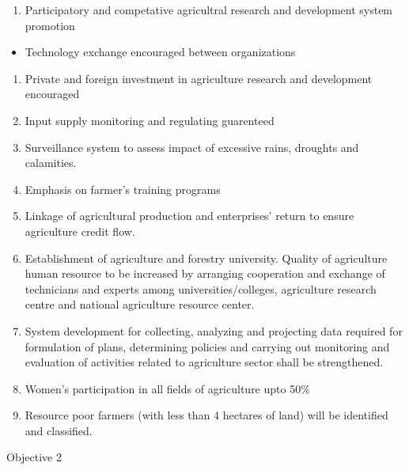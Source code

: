 \documentclass[
  openany]{book}
\providecommand{\tightlist}{%
  \setlength{\itemsep}{0pt}\setlength{\parskip}{0pt}}
\begin{document}
\begin{itemize}
  \begin{enumerate}
  \def\labelenumi{\arabic{enumi}.}
  \setcounter{enumi}{8}
  \tightlist
  \item
    Participatory and competative agricultral research and development system promotion
  \end{enumerate}

  \begin{itemize}
  \tightlist
  \item
    Technology exchange encouraged between organizations
  \end{itemize}

  \begin{enumerate}
  \def\labelenumi{\arabic{enumi}.}
  \setcounter{enumi}{9}
  \tightlist
  \item
    Private and foreign investment in agriculture research and development encouraged
  \item
    Input supply monitoring and regulating guarenteed
  \item
    Surveillance system to assess impact of excessive rains, droughts and calamities.
  \item
    Emphasis on farmer's training programs
  \item
    Linkage of agricultural production and enterprises' return to ensure agriculture credit flow.
  \item
    Establishment of agriculture and forestry university. Quality of agriculture human resource to be increased by arranging cooperation and exchange of technicians and experts among universities/colleges, agriculture research centre and national agriculture resource center.
  \item
    System development for collecting, analyzing and projecting data required for formulation of plans, determining policies and carrying out monitoring and evaluation of activities related to agriculture sector shall be strengthened.
  \item
    Women's participation in all fields of agriculture upto 50\%
  \item
    Resource poor farmers (with less than 4 hectares of land) will be identified and classified.
  \end{enumerate}
\end{itemize}

Objective 2
\end{document}
